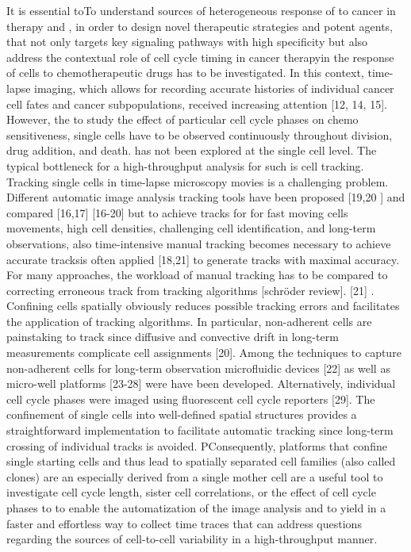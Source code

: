 \documentclass[pdftex,12pt,a4paper]{report}
\begin{document}
It is essential toTo understand sources of heterogeneous response of to cancer in therapy and , in order to design novel therapeutic strategies and potent agents,  that not only targets key signaling pathways with high specificity but also address the contextual role of cell cycle timing in cancer therapyin the response of cells to chemotherapeutic drugs has to be investigated. In this context, time-lapse imaging, which allows for recording accurate histories of individual cancer cell fates and cancer subpopulations, received increasing attention [12, 14, 15]. However, the to study the effect of particular cell cycle phases on chemo sensitiveness, single cells have to be observed continuously throughout division, drug addition, and death.  has not been explored at the single cell level. 
The typical bottleneck for a high-throughput analysis for such is cell tracking. Tracking single cells in time-lapse microscopy movies is a challenging problem. Different automatic image analysis tracking tools have been proposed [19,20 ] and compared [16,17]  [16-20]  but to achieve tracks for for fast moving cells movements, high cell densities, challenging cell identification, and long-term observations, also time-intensive manual tracking becomes necessary to achieve accurate tracksis often applied [18,21] to generate tracks with maximal accuracy. For many approaches, the workload of manual tracking has to be compared to correcting erroneous track from tracking algorithms [schröder review].   [21] . Confining cells spatially obviously reduces possible tracking errors and facilitates the application of tracking algorithms. In particular, non-adherent cells are painstaking to track since diffusive and convective drift in long-term measurements complicate cell assignments [20]. Among the techniques to capture non-adherent cells for long-term observation microfluidic devices [22] as well as micro-well platforms [23-28] were have been developed. Alternatively, individual cell cycle phases were imaged using fluorescent cell cycle reporters [29].  The confinement of single cells into well-defined spatial structures provides a straightforward implementation to facilitate automatic tracking since long-term crossing of individual tracks is avoided. PConsequently, platforms that confine single starting cells and thus lead to spatially separated cell families (also called clones) are an especially derived from a single mother cell are a useful tool to investigate cell cycle length, sister cell correlations, or the effect of cell cycle phases to to enable the automatization of the image analysis and to yield in a faster and effortless way to collect time traces that can address questions regarding the sources of cell-to-cell variability in a high-throughput manner. 
\end{document}
